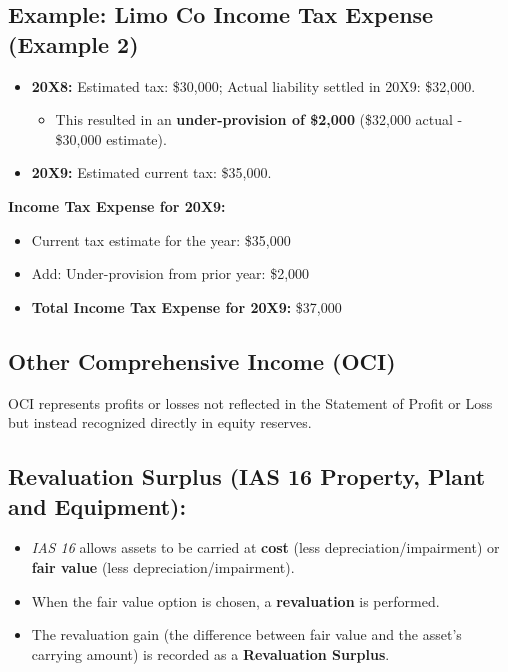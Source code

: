 \subsection*{Example: Limo Co Income Tax Expense (Example 2)}

\begin{itemize}
    \item \textbf{20X8:} Estimated tax: \$30,000; Actual liability settled in 20X9: \$32,000.
    \begin{itemize}
        \item This resulted in an \textbf{under-provision of \$2,000} (\$32,000 actual - \$30,000 estimate).
    \end{itemize}
    \item \textbf{20X9:} Estimated current tax: \$35,000.
\end{itemize}

\textbf{Income Tax Expense for 20X9:}
\begin{itemize}
    \item Current tax estimate for the year: \$35,000
    \item Add: Under-provision from prior year: \$2,000
    \item \textbf{Total Income Tax Expense for 20X9:} \$37,000
\end{itemize}

\subsection{Other Comprehensive Income (OCI)}

OCI represents profits or losses not reflected in the Statement of Profit or Loss but instead recognized directly in equity reserves.

\subsection*{Revaluation Surplus (IAS 16 Property, Plant and Equipment):}

\begin{itemize}
    \item \textit{IAS 16} allows assets to be carried at \textbf{cost} (less depreciation/impairment) or \textbf{fair value} (less depreciation/impairment).
    \item When the fair value option is chosen, a \textbf{revaluation} is performed.
    \item The revaluation gain (the difference between fair value and the asset's carrying amount) is recorded as a \textbf{Revaluation Surplus}.
\end{itemize}

